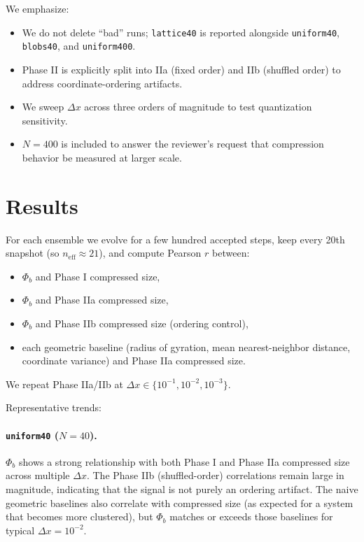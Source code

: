 \documentclass[11pt,a4paper]{article}
\numberwithin{equation}{section}
\newcommand{\phib}{\Phi_b}
\begin{document}
We emphasize:
\begin{itemize}
\item We do not delete ``bad'' runs; \texttt{lattice40} is reported alongside \texttt{uniform40}, \texttt{blobs40}, and \texttt{uniform400}.
\item Phase II is explicitly split into IIa (fixed order) and IIb (shuffled order) to address coordinate-ordering artifacts.
\item We sweep $\Delta x$ across three orders of magnitude to test quantization sensitivity.
\item $N{=}400$ is included to answer the reviewer's request that compression behavior be measured at larger scale.
\end{itemize}

\section{Results}
\label{sec:results}

For each ensemble we evolve for a few hundred accepted steps, keep every 20th snapshot (so $n_{\text{eff}}\approx 21$), and compute Pearson $r$ between:
\begin{itemize}
\item $\phib$ and Phase I compressed size,
\item $\phib$ and Phase IIa compressed size,
\item $\phib$ and Phase IIb compressed size (ordering control),
\item each geometric baseline (radius of gyration, mean nearest-neighbor distance, coordinate variance) and Phase IIa compressed size.
\end{itemize}
We repeat Phase IIa/IIb at $\Delta x \in \{10^{-1},10^{-2},10^{-3}\}$.

Representative trends:

\paragraph{\texttt{uniform40} ($N{=}40$).}
$\phib$ shows a strong relationship with both Phase I and Phase IIa compressed size across multiple $\Delta x$. The Phase IIb (shuffled-order) correlations remain large in magnitude, indicating that the signal is not purely an ordering artifact. The naive geometric baselines also correlate with compressed size (as expected for a system that becomes more clustered), but $\phib$ matches or exceeds those baselines for typical $\Delta x=10^{-2}$.
\end{document}
